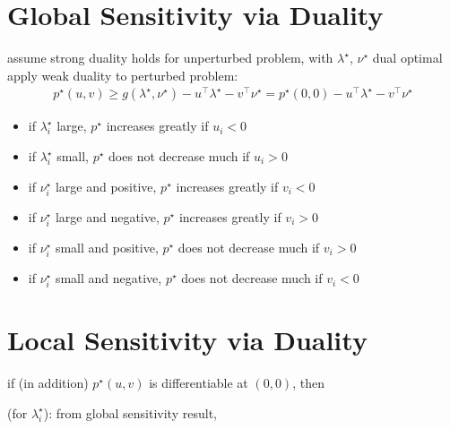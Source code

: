 \documentclass[11pt]{extarticle}
\theoremstyle{definition}
\begin{document}
\newpage

\section*{Global Sensitivity via Duality}

assume strong duality holds for unperturbed problem, with $\lambda^\star$, $\nu^\star$ dual optimal \\

\noindent
apply weak duality to perturbed problem:  
\begin{align*}
  p^\star(u, v)\geqslant g(\lambda^\star, \nu^\star) - u^\top\lambda^\star - v^\top\nu^\star = p^\star(0, 0) - u^\top\lambda^\star - v^\top\nu^\star 
\end{align*}

\begin{itemize}\setlength\itemsep{0em}
  \item if $\lambda_i^\star$ large, $p^\star$ increases greatly if $u_i < 0$
  \item if $\lambda_i^\star$ small, $p^\star$ does not decrease much if $u_i > 0$
  \item if $\nu_i^\star$ large and positive, $p^\star$ increases greatly if $v_i < 0$
  \item if $\nu_i^\star$ large and negative, $p^\star$ increases greatly if $v_i > 0$
  \item if $\nu_i^\star$ small and positive, $p^\star$ does not decrease much if $v_i > 0$
  \item if $\nu_i^\star$ small and negative, $p^\star$ does not decrease much if $v_i < 0$
\end{itemize}

\newpage

\section*{Local Sensitivity via Duality}

if (in addition) $p^\star(u, v)$ is differentiable at $(0, 0)$, then  \\

 (for $\lambda_i^\star$): from global sensitivity result, \\
\end{document}
